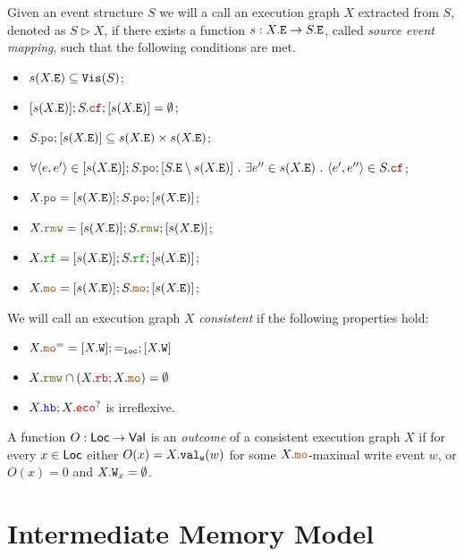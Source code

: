 \documentclass[12pt]{article}
\begin{document}
\begin{definition}
  Given an event structure $S$ we will a call an execution graph $X$
  extracted from $S$, denoted as $S \rhd X$,
  if there exists a function $s : X.{\mathtt{E}} \rightarrow S.{\mathtt{E}}$, called \emph{source event mapping},
  such that the following conditions are met.
  \begin{itemize}
    \item $s(X.{\mathtt{E}}) \subseteq {\mathtt{Vis}}(S)$;
    \item $[s(X.\lE)];S.\lCF;[s(X.\lE)] = \emptyset$;
    \item $S.\lPO;[s(X.\lE)] \subseteq s(X.\lE) \times s(X.\lE)$;
    \item $\forall{\tup{e, e'}} \in [s(X.\lE)];S.\lPO;[S.\lE \setminus s(X.\lE)] ~.~ 
      \exists{e''} \in s(X.\lE) ~.~ \tup{e', e''} \in S.\lCF$;
    \item $X.\lPO = [s(X.\lE)];S.\lPO;[s(X.\lE)]$;
    \item $X.\lRMW = [s(X.\lE)];S.\lRMW;[s(X.\lE)]$;
    \item $X.\lRF = [s(X.\lE)];S.\lRF;[s(X.\lE)]$;
    \item $X.\lMO = [s(X.\lE)];S.\lMO;[s(X.\lE)]$;
  \end{itemize}
\end{definition}

\begin{definition}
  We will call an execution graph $X$ \emph{consistent} if the following properties hold:
  \begin{itemize}
    \item $X.\lMO^= = [X.\lW];=_{\lLOC};[X.\lW]$
    \item $X.\lRMW \cap (X.\lRB;X.\lMO) = \emptyset$
    \item $X.\lHB;X.\lECO^?$ is irreflexive.
  \end{itemize}
\end{definition}

\begin{definition}
  A function $O : \mathsf{Loc} \rightarrow \mathsf{Val}$ is an \emph{outcome} 
  of a consistent execution graph $X$
  if for every $x \in \mathsf{Loc}$ either $O(x) = X.{\mathtt{val_w}}(w)$ 
  for some $X.\lMO$-maximal write event $w$, 
  or $O(x) = 0$ and $X.{\mathtt{W}}_x = \emptyset$.
\end{definition}

\section{Intermediate Memory Model}
\end{document}
